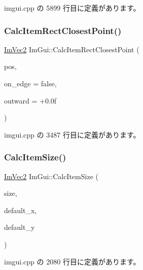  imgui.\+cpp の 5899 行目に定義があります。

\mbox{\label{namespace_im_gui_a6c66a7acf7e6eef639b5f1211d8332a3}} 
\subsubsection{\texorpdfstring{Calc\+Item\+Rect\+Closest\+Point()}{CalcItemRectClosestPoint()}}
{\footnotesize\ttfamily \mbox{\hyperlink{struct_im_vec2}{Im\+Vec2}} Im\+Gui\+::\+Calc\+Item\+Rect\+Closest\+Point (\begin{DoxyParamCaption}\item[{const \mbox{\hyperlink{struct_im_vec2}{Im\+Vec2}} \&}]{pos,  }\item[{bool}]{on\+\_\+edge = {\ttfamily false},  }\item[{float}]{outward = {\ttfamily +0.0f} }\end{DoxyParamCaption})}



 imgui.\+cpp の 3487 行目に定義があります。

\mbox{\label{namespace_im_gui_a3c1505e785f9571ed82500692a727c5f}} 
\subsubsection{\texorpdfstring{Calc\+Item\+Size()}{CalcItemSize()}}
{\footnotesize\ttfamily \mbox{\hyperlink{struct_im_vec2}{Im\+Vec2}} Im\+Gui\+::\+Calc\+Item\+Size (\begin{DoxyParamCaption}\item[{\mbox{\hyperlink{struct_im_vec2}{Im\+Vec2}}}]{size,  }\item[{float}]{default\+\_\+x,  }\item[{float}]{default\+\_\+y }\end{DoxyParamCaption})}



 imgui.\+cpp の 2080 行目に定義があります。

\mbox{\label{namespace_im_gui_ab3b3ba92ebd8bca4a552dd93321a1994}} 
